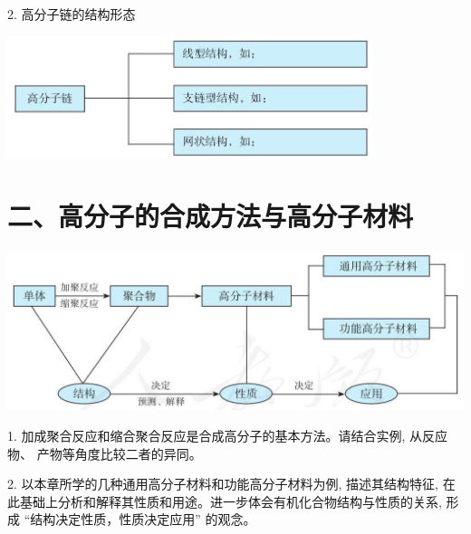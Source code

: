\documentclass[10pt]{article}
\begin{document}
\begin{center}
\end{center}

2. 高分子链的结构形态

\begin{center}
\includegraphics[max width=0.8\textwidth]{images/0190efc5-b58a-7c43-bfb0-e0a030df9cfd_157_245656.jpg}
\end{center}

\section*{二、高分子的合成方法与高分子材料}

\begin{center}
\includegraphics[max width=1.0\textwidth]{images/0190efc5-b58a-7c43-bfb0-e0a030df9cfd_157_434001.jpg}
\end{center}

1. 加成聚合反应和缩合聚合反应是合成高分子的基本方法。请结合实例, 从反应物、 产物等角度比较二者的异同。

2. 以本章所学的几种通用高分子材料和功能高分子材料为例, 描述其结构特征, 在此基础上分析和解释其性质和用途。进一步体会有机化合物结构与性质的关系, 形成 “结构决定性质，性质决定应用” 的观念。
\end{document}

